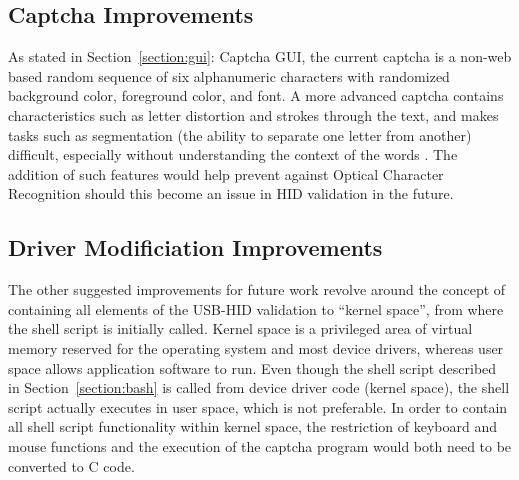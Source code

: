 \documentclass[pagenumbers]{ieee}
\begin{document}
\subsection{Captcha Improvements}
\label{section:futureworkcaptcha}

As stated in Section~\ref{section:gui}: Captcha GUI, the current captcha is a non-web based random sequence of six alphanumeric characters with randomized background color, foreground color, and font. A more advanced captcha contains characteristics such as letter distortion and strokes through the text, and makes tasks such as segmentation (the ability to separate one letter from another) difficult, especially without understanding the context of the words \cite{captcha}. The addition of such features would help prevent against Optical Character Recognition should this become an issue in HID validation in the future.

\subsection{Driver Modificiation Improvements}
\label{section:futureworkdriver}

The other suggested improvements for future work revolve around the concept of containing all elements of the USB-HID validation to ``kernel space'', from where the shell script is initially called. Kernel space is a privileged area of virtual memory reserved for the operating system and most device drivers, whereas user space allows application software to run. Even though the shell script described in Section~\ref{section:bash} is called from device driver code (kernel space), the shell script actually executes in user space, which is not preferable. In order to contain all shell script functionality within kernel space, the restriction of keyboard and mouse functions and the execution of the captcha program would both need to be converted to C code. 
\end{document}
